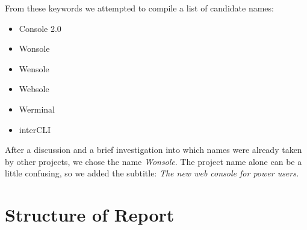 From these keywords we attempted to compile a list of candidate names:
\begin{itemize}
\item Console 2.0
\item Wonsole
\item Wensole
\item Websole
\item Werminal
\item interCLI
\end{itemize}

After a discussion and a brief investigation into which names were already taken by other projects, we chose the name \emph{Wonsole}. The project name alone can be a little confusing, so we added the subtitle: \emph{The new web console for power users.}

\section{Structure of Report}






